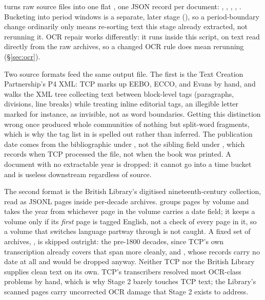 \documentclass[11pt]{article}
\begin{document}
 turns raw source files into one flat
, one JSON record per document:
, , , , .
Bucketing into period windows is a separate, later stage
(), so a period-boundary change ordinarily only
means re-sorting text this stage already extracted, not rerunning it.
OCR repair works differently: it runs inside this script, on text read
directly from the raw archives, so a changed OCR rule does mean
rerunning  (\S\ref{sec:ocr}).

Two source formats feed the same output file. The first is the Text
Creation Partnership's P4 XML: TCP marks up EEBO, ECCO, and Evans by
hand, and  walks the XML tree collecting text
between block-level tags (paragraphs, divisions, line breaks) while
treating inline editorial tags, an illegible letter marked
 for instance, as invisible, not as word boundaries.
Getting this distinction wrong once produced whole communities of
nothing but split-word fragments, which is why the tag list in
 is spelled out rather than inferred. The publication
date comes from the bibliographic  under
, not the sibling field under , which
records when TCP processed the file, not when the book was printed. A
document with no extractable year is dropped: it cannot go into a time
bucket and is useless downstream regardless of source.

The second format is the British Library's digitised nineteenth-century
collection, read as JSONL pages inside per-decade 
archives.  groups pages by volume and takes the
year from whichever page in the volume carries a date field; it keeps a
volume only if its \emph{first} page is tagged English, not a check of
every page in it, so a volume that switches language partway through is
not caught. A fixed set of archives, , is
skipped outright: the pre-1800 decades, since TCP's own transcription
already covers that span more cleanly, and , whose
records carry no date at all and would be dropped anyway. Neither TCP
nor the British Library supplies clean text on its own. TCP's
transcribers resolved most OCR-class problems by hand, which is why
Stage 2 barely touches TCP text; the Library's scanned pages carry
uncorrected OCR damage that Stage 2 exists to address.
\end{document}
